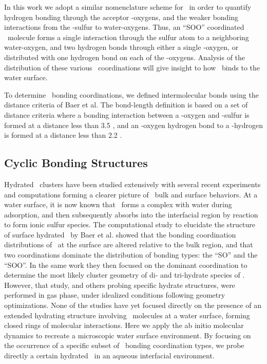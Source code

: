 \documentclass{article}
\begin{document}
In this work we adopt a similar nomenclature scheme for \suldiox~in order to quantify hydrogen bonding through the acceptor \suldiox-oxygens, and the weaker bonding interactions from the \suldiox-sulfur to water-oxygens. Thus, an ``SOO'' coordinated \suldiox~molecule forms a single interaction through the sulfur atom to a neighboring water-oxygen, and two hydrogen bonds through either a single \suldiox-oxygen, or distributed with one hydrogen bond on each of the \suldiox-oxygens. Analysis of the distribution of these various \suldiox~coordinations will give insight to how \suldiox~binds to the water surface.

To determine \suldiox~bonding coordinations, we defined intermolecular bonds using the distance criteria of Baer et al.\cite{Baer2010} The bond-length definition is based on a set of distance criteria where a bonding interaction between a \wat-oxygen and \suldiox-sulfur is formed at a distance less than 3.5 \angs, and an \suldiox-oxygen hydrogen bond to a \wat-hydrogen is formed at a distance less than 2.2 \angs.

\subsection {Cyclic Bonding Structures}

Hydrated \suldiox~clusters have been studied extensively with several recent experiments and computations forming a clearer picture of \suldiox~bulk and surface behaviors.\cite{Baer2010, Tarbuck2005, Tarbuck2006, Ota2011, Bishenden1998, Hirabayashi2006, Steudel2009, Yang2002, Hayashi1985, Moin2011, Eckl2008, Jayne1990, Jayne1990a, Donaldson1995} At a water surface, it is now known that \suldiox~forms a complex with water during adsorption, and then subsequently absorbs into the interfacial region by reaction to form ionic sulfur species.\cite{Tarbuck2005, Tarbuck2006, Ota2011} The computational study to elucidate the structure of surface hydrated \suldiox~by Baer et al. showed that the bonding coordination distributions of \suldiox~at the surface are altered relative to the bulk region, and that two coordinations dominate the distribution of bonding types: the ``SO'' and the ``SOO''. In the same work they then focused on the dominant coordination to determine the most likely cluster geometry of di- and tri-hydrate species of \suldiox. However, that study, and others probing specific hydrate structures, were performed in gas phase, under idealized conditions following geometry optimizations. None of the studies have yet focused directly on the presence of an extended hydrating structure involving \suldiox~molecules at a water surface, forming closed rings of molecular interactions. Here we apply the ab initio molecular dynamics to recreate a microscopic water surface environment. By focusing on the occurrence of a specific subset of \suldiox~bonding coordination types, we probe directly a certain hydrated \suldiox~in an aqueous interfacial environment.
\end{document}
